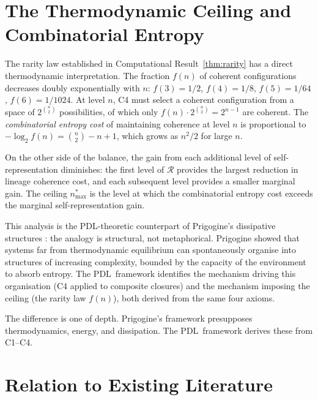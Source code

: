 \documentclass[12pt,a4paper]{article}
\theoremstyle{plain}
\theoremstyle{definition}
\theoremstyle{remark}
\newcommand{\PDL}{\textsc{PDL}}
\newcommand{\Rop}{\mathcal{R}}
\begin{document}
\section{The Thermodynamic Ceiling and Combinatorial Entropy}
\label{sec:entropy}

The rarity law established in Computational Result~\ref{thm:rarity} has a direct
thermodynamic interpretation. The fraction $f(n)$ of coherent configurations
decreases doubly exponentially with $n$: $f(3) = 1/2$, $f(4) = 1/8$, $f(5) =
1/64$, $f(6) = 1/1024$. At level $n$, C4 must select a coherent configuration from
a space of $2^{\binom{n}{2}}$ possibilities, of which only $f(n) \cdot
2^{\binom{n}{2}} = 2^{n-1}$ are coherent. The \emph{combinatorial entropy cost} of
maintaining coherence at level $n$ is proportional to $-\log_2 f(n) = \binom{n}{2}
- n + 1$, which grows as $n^2/2$ for large $n$.

On the other side of the balance, the gain from each additional level of
self-representation diminishes: the first level of $\Rop$ provides the largest
reduction in lineage coherence cost, and each subsequent level provides a smaller
marginal gain. The ceiling $n^{*}_{\mathrm{max}}$ is the level at which the
combinatorial entropy cost exceeds the marginal self-representation gain.

This analysis is the PDL-theoretic counterpart of Prigogine's dissipative structures
\cite{Prigogine1977}: the analogy is structural, not metaphorical. Prigogine showed
that systems far from thermodynamic equilibrium can spontaneously organise into
structures of increasing complexity, bounded by the capacity of the environment to
absorb entropy. The \PDL\ framework identifies the mechanism driving this
organisation (C4 applied to composite closures) and the mechanism imposing the
ceiling (the rarity law $f(n)$), both derived from the same four axioms.

The difference is one of depth. Prigogine's framework presupposes thermodynamics,
energy, and dissipation. The \PDL\ framework derives these from C1--C4.

\section{Relation to Existing Literature}
\label{sec:literature}
\end{document}
